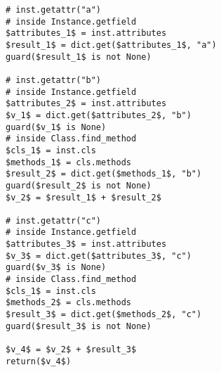 \begin{lstlisting}[mathescape,basicstyle=\ttfamily]
# inst.getattr("a")
# inside Instance.getfield
$attributes_1$ = inst.attributes
$result_1$ = dict.get($attributes_1$, "a")
guard($result_1$ is not None)

# inst.getattr("b")
# inside Instance.getfield
$attributes_2$ = inst.attributes
$v_1$ = dict.get($attributes_2$, "b")
guard($v_1$ is None)
# inside Class.find_method
$cls_1$ = inst.cls
$methods_1$ = cls.methods
$result_2$ = dict.get($methods_1$, "b")
guard($result_2$ is not None)
$v_2$ = $result_1$ + $result_2$

# inst.getattr("c")
# inside Instance.getfield
$attributes_3$ = inst.attributes
$v_3$ = dict.get($attributes_3$, "c")
guard($v_3$ is None)
# inside Class.find_method
$cls_1$ = inst.cls
$methods_2$ = cls.methods
$result_3$ = dict.get($methods_2$, "c")
guard($result_3$ is not None)

$v_4$ = $v_2$ + $result_3$
return($v_4$)
\end{lstlisting}

